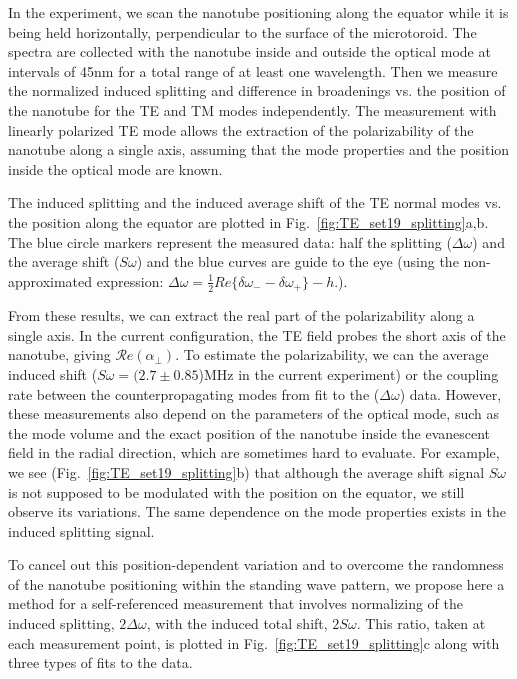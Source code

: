\documentclass[journal=jacsat,manuscript=article]{achemso}
\begin{document}
In the experiment, we scan the nanotube positioning along the equator while it is being held horizontally, perpendicular to the surface of the microtoroid. The spectra are collected with the nanotube inside and outside the optical mode at intervals of 45nm for a total range of at least one wavelength. Then we measure the normalized induced splitting and difference in broadenings vs. the position of the nanotube for the TE and TM modes independently. The measurement with linearly polarized TE mode allows the extraction of the polarizability of the nanotube along a single axis, assuming that the mode properties and the position inside the optical mode are known.

The induced splitting and the induced average shift of the TE normal modes vs. the position along the equator are plotted in Fig.~\ref{fig:TE_set19_splitting}a,b. The blue circle markers represent the measured data: half the splitting ($\Delta \omega$) and the average shift ($\textit{S} \omega$) and the blue curves are guide to the eye (using the non-approximated expression: $\Delta\omega = \frac{1}{2}Re\{\delta\omega_- -\delta\omega_+\}-h$.).

From these results, we can extract the real part of the polarizability along a single axis. In the current configuration, the TE field probes the short axis of the nanotube, giving $\mathcal{R}e(\alpha_{\perp})$. To estimate the polarizability, we can the average induced shift ($S\omega = (2.7 \pm 0.85$)MHz in the current experiment) or the coupling rate between the counterpropagating modes from fit to the ($\Delta \omega$) data. However, these measurements also depend on the parameters of the optical mode, such as the mode volume and the exact position of the nanotube inside the evanescent field in the radial direction, which are sometimes hard to evaluate. For example, we see (Fig.~\ref{fig:TE_set19_splitting}b) that although the average shift signal $S\omega$ is not supposed to be modulated with the position on the equator, we still observe its variations. The same dependence on the mode properties exists in the induced splitting signal.

To cancel out this position-dependent variation and to overcome the randomness of the nanotube positioning within the standing wave pattern, we propose here a method for a self-referenced measurement that involves normalizing of the induced splitting, $2\Delta\omega$, with the induced total shift, $2S\omega$. This ratio, taken at each measurement point, is plotted in Fig.~\ref{fig:TE_set19_splitting}c along with three types of fits to the data.
\end{document}
